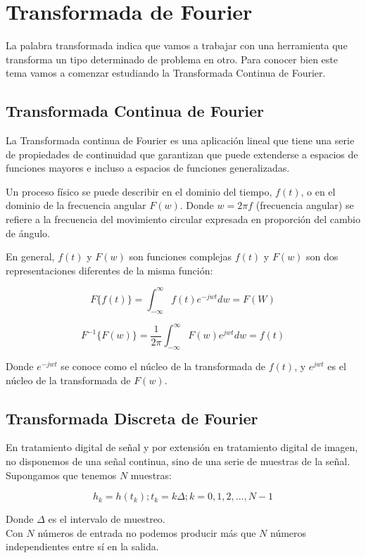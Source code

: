 \documentclass[a4paper]{article}
\begin{document}
\section{Transformada de Fourier}

La palabra transformada indica que vamos a trabajar con una herramienta que transforma un tipo determinado de problema en otro. Para conocer bien este tema vamos a comenzar estudiando la Transformada Continua de Fourier.

\subsection{Transformada Continua de Fourier}

La Transformada continua de Fourier es una aplicación lineal que tiene una serie de propiedades de continuidad que garantizan que puede extenderse a espacios de funciones mayores e incluso a espacios de funciones generalizadas.

Un proceso físico se puede describir en el dominio del tiempo, $f(t)$,  o en el dominio de la frecuencia angular $F(w)$. Donde  $w = 2 \pi f$ (frecuencia angular) se refiere a la frecuencia del movimiento circular expresada en proporción del cambio de ángulo.

En general, $f(t)$ y $F(w)$ son funciones complejas $f(t)$  y $F(w)$ son dos representaciones diferentes de la misma función:


$$F \{f(t)\} = \int_{-\infty}^{\infty} f(t) e^{-jwt} dw = F(W)  $$


$$F^{-1}\{F(w)\} = \frac{1}{2\pi} \int_{-\infty}^{\infty}  F(w) e^{jwt} dw = f(t) $$

Donde $e^{-jwt}$ se conoce como el núcleo de la transformada de $f(t)$, y $e^{jwt}$ es el núcleo de la transformada de $F(w)$.

\subsection{Transformada Discreta de Fourier}

En tratamiento digital de señal y por extensión en tratamiento digital de imagen, no disponemos de una señal continua, sino de una serie de muestras de la señal. Supongamos que tenemos $N$ muestras:  

$$ h_k = h(t_k); t_k = k \Delta; k = 0,1,2,..., N-1 $$

Donde $\Delta$ es el intervalo de muestreo.\\

Con $N$ números de entrada no podemos producir más que $N$ números independientes entre sí en la salida.\\
\end{document}
